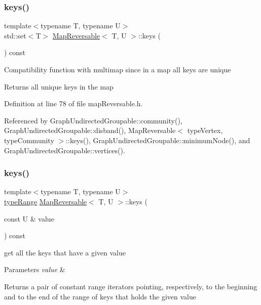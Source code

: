 \subsubsection{\texorpdfstring{keys()}{keys()}\hspace{0.1cm}{\footnotesize\ttfamily [1/2]}}
{\footnotesize\ttfamily template$<$typename T, typename U$>$ \\
std\+::set$<$T$>$ \hyperlink{classMapReversable}{Map\+Reversable}$<$ T, U $>$\+::keys (\begin{DoxyParamCaption}{ }\end{DoxyParamCaption}) const\hspace{0.3cm}{\ttfamily [inline]}}

Compatibility function with multimap since in a map all keys are unique \begin{DoxyReturn}{Returns}
all unique keys in the map 
\end{DoxyReturn}


Definition at line 78 of file map\+Reversable.\+h.



Referenced by Graph\+Undirected\+Groupable\+::community(), Graph\+Undirected\+Groupable\+::disband(), Map\+Reversable$<$ type\+Vertex, type\+Community $>$\+::keys(), Graph\+Undirected\+Groupable\+::minimum\+Node(), and Graph\+Undirected\+Groupable\+::vertices().

\mbox{\label{classMapReversable_aeeaeddaca58315c4a1c7f310f999694a}} 
\subsubsection{\texorpdfstring{keys()}{keys()}\hspace{0.1cm}{\footnotesize\ttfamily [2/2]}}
{\footnotesize\ttfamily template$<$typename T, typename U$>$ \\
\hyperlink{classMapReversable_a00452d0ddb300578955ed93560508ad0}{type\+Range} \hyperlink{classMapReversable}{Map\+Reversable}$<$ T, U $>$\+::keys (\begin{DoxyParamCaption}\item[{const U \&}]{value }\end{DoxyParamCaption}) const\hspace{0.3cm}{\ttfamily [inline]}}

get all the keys that have a given value 
\begin{DoxyParams}{Parameters}
{\em value} & \\
\hline
\end{DoxyParams}
\begin{DoxyReturn}{Returns}
a pair of constant range iterators pointing, respectively, to the beginning and to the end of the range of keys that holds the given value 
\end{DoxyReturn}



